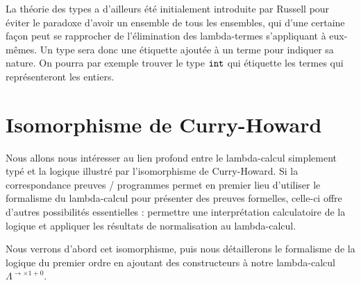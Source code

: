 La théorie des types a d'ailleurs été initialement introduite par Russell pour éviter le paradoxe d'avoir un ensemble de tous les ensembles, qui d'une certaine façon peut se rapprocher de l'élimination des lambda-termes s'appliquant à eux-mêmes. Un type sera donc une étiquette ajoutée à un terme pour indiquer sa nature. On pourra par exemple trouver le type $\texttt{int}$ qui étiquette les termes qui représenteront les entiers.







\chapter{Isomorphisme de Curry-Howard}

Nous allons nous intéresser au lien profond entre le lambda-calcul simplement typé et la logique illustré par l'isomorphisme de Curry-Howard. Si la correspondance preuves / programmes permet en premier lieu d'utiliser le formalisme du lambda-calcul pour présenter des preuves formelles, celle-ci offre d'autres possibilités essentielles : permettre une interprétation calculatoire de la logique et appliquer les résultats de normalisation au lambda-calcul.

Nous verrons d'abord cet isomorphisme, puis nous détaillerons le formalisme de la logique du premier ordre en ajoutant des constructeurs à notre lambda-calcul $\Lambda^{\to\times 1+0}$.

